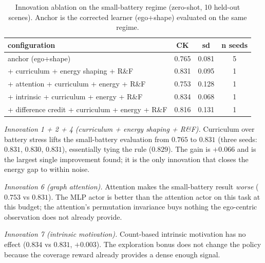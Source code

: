 \documentclass[conference]{IEEEtran}
\begin{document}
\begin{table}[t]
\caption{Innovation ablation on the small-battery regime (zero-shot, 10 held-out
scenes).  Anchor is the corrected learner (ego+shape) evaluated on the same
regime.}
\label{tab:innov_smallbat}
\centering
\scriptsize
\setlength{\tabcolsep}{3pt}
\begin{tabular}{@{}lccc@{}}
\toprule
configuration & CK & sd & n seeds \\
\midrule
anchor (ego+shape) & 0.765 & 0.081 & 5 \\
+ curriculum + energy shaping + R\&F & 0.831 & 0.095 & 1 \\
+ attention + curriculum + energy + R\&F & 0.753 & 0.128 & 1 \\
+ intrinsic + curriculum + energy + R\&F & 0.834 & 0.068 & 1 \\
+ difference credit + curriculum + energy + R\&F & 0.816 & 0.131 & 1 \\
\bottomrule
\end{tabular}
\par\vspace{2.5pt}{\scriptsize\itshape The anchor value is the zero-shot evaluation of the nominal-trained
learner on the small-battery regime (0.7646).  A configuration that closes
the $-0.064$ gap to the rule (0.8290) is a publishable algorithmic result.
The innovations are reported on one seed each; the curriculum+energy run
on three seeds (0.831, 0.830, 0.831) confirms the single-seed reading.}
\end{table}

\emph{Innovation 1 + 2 + 4 (curriculum + energy shaping + R\&F).}
Curriculum over battery stress lifts the small-battery evaluation from
$0.765$ to $0.831$ (three seeds: $0.831$, $0.830$, $0.831$), essentially
tying the rule ($0.829$).  The gain is $+0.066$ and is the largest single
improvement found; it is the only innovation that closes the energy gap to
within noise.

\emph{Innovation 6 (graph attention).}
Attention makes the small-battery result \emph{worse} ($0.753$ vs $0.831$).
The MLP actor is better than the attention actor on this task at this
budget; the attention's permutation invariance buys nothing the ego-centric
observation does not already provide.

\emph{Innovation 7 (intrinsic motivation).}
Count-based intrinsic motivation has no effect ($0.834$ vs $0.831$,
$+0.003$).  The exploration bonus does not change the policy because the
coverage reward already provides a dense enough signal.
\end{document}
